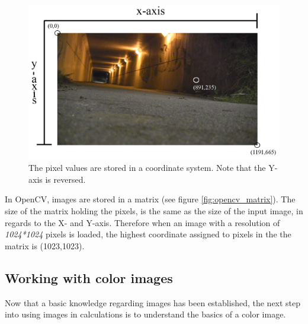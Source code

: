\begin{figure}[htbp]
\centering
\includegraphics[width=1.00\textwidth]{Pictures/Theory/IndexingAPicture}
\caption{The pixel values are stored in a coordinate system. Note that the Y-axis is reversed.}
\label{fig:ip_IndexingAPicture}
\end{figure}

In OpenCV, images are stored in a matrix (see figure \ref{fig:opencv_matrix}). The size of the matrix holding the pixels, is the same as the size of the input image, in regards to the X- and Y-axis. Therefore when an image with a resolution of \textit{1024*1024} pixels is loaded, the highest coordinate assigned to pixels in the the matrix is (1023,1023).


\subsection{Working with color images}
Now that a basic knowledge regarding images has been established, the next step into using images in calculations is to understand the basics of a color image.

